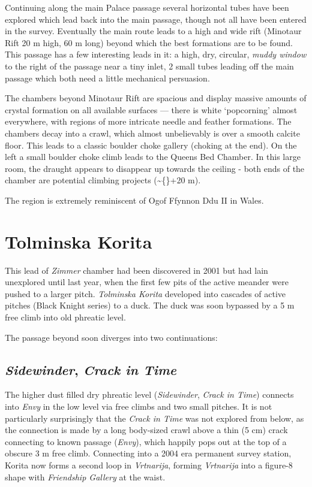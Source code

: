 Continuing along the main Palace passage several horizontal tubes have
been explored which lead back into the main passage, though not all have
been entered in the survey. Eventually the main route leads to a high
and wide rift (Minotaur Rift \textemdash{} 20 m high, 60 m long) beyond
which the best formations are to be found. This passage has a few
interesting leads in it: a high, dry, circular, \emph{muddy window} to
the right of the passage near a tiny inlet, 2 small tubes leading off
the main passage which both need a little mechanical persuasion.

The chambers beyond Minotaur Rift are spacious and display massive
amounts of crystal formation on all available surfaces --- there is
white `popcorning' almost everywhere, with regions of more intricate
needle and feather formations. The chambers decay into a crawl, which
almost unbelievably is over a smooth calcite floor. This leads to a
classic boulder choke gallery (choking at the end). On the left a small
boulder choke climb leads to the Queens Bed Chamber. In this large room,
the draught appears to disappear up towards the ceiling - both ends of
the chamber are potential climbing projects (\textasciitilde\{\}+20 m).

The region is extremely reminiscent of Ogof Ffynnon Ddu II in Wales.

\hypertarget{tolminska-korita}{%
\section{Tolminska Korita}\label{tolminska-korita}}

This lead of \emph{Zimmer} chamber had been discovered in 2001 but had
lain unexplored until last year, when the first few pits of the active
meander were pushed to a larger pitch. \emph{Tolminska Korita} developed
into cascades of active pitches (Black Knight series) to a duck. The
duck was soon bypassed by a 5 m free climb into old phreatic level.

The passage beyond soon diverges into two continuations:

\hypertarget{sidewinder-crack-in-time}{%
\subsection{\texorpdfstring{\emph{Sidewinder}, \emph{Crack in
Time}}{Sidewinder, Crack in Time}}\label{sidewinder-crack-in-time}}

The higher dust filled dry phreatic level (\emph{Sidewinder},
\emph{Crack in Time}) connects into \emph{Envy} in the low level via
free climbs and two small pitches. It is not particularly surprisingly
that the \emph{Crack in Time} was not explored from below, as the
connection is made by a long body-sized crawl above a thin (5 cm) crack
connecting to known passage (\emph{Envy}), which happily pops out at the
top of a obscure 3 m free climb. Connecting into a 2004 era permanent
survey station, Korita now forms a second loop in \emph{Vrtnarija},
forming \emph{Vrtnarija} into a figure-8 shape with \emph{Friendship
Gallery} at the waist.

